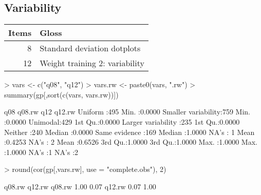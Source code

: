 \documentclass[11pt]{article}
\begin{document}
\subsection{Variability}
\label{sec-3-4}
\begin{center}
\begin{tabular}{rl}
\textbf{Items} & \textbf{Gloss}\\
\hline
8 & Standard deviation dotplots\\
12 & Weight training 2: variability\\
\end{tabular}
\end{center}


\begin{Schunk}
\begin{Sinput}
> vars <- c("q08", "q12")
> vars.rw <- paste0(vars, ".rw")
> summary(gp[,sort(c(vars, vars.rw))])
\end{Sinput}
\begin{Soutput}
       q08          q08.rw                        q12          q12.rw      
 Uniform :495   Min.   :0.0000   Smaller variability:759   Min.   :0.0000  
 Unimodal:429   1st Qu.:0.0000   Larger variability :235   1st Qu.:0.0000  
 Neither :240   Median :0.0000   Same evidence      :169   Median :1.0000  
 NA's    :  1   Mean   :0.4253   NA's               :  2   Mean   :0.6526  
                3rd Qu.:1.0000                             3rd Qu.:1.0000  
                Max.   :1.0000                             Max.   :1.0000  
                NA's   :1                                  NA's   :2       
\end{Soutput}
\begin{Sinput}
> round(cor(gp[,vars.rw], use = "complete.obs"), 2)
\end{Sinput}
\begin{Soutput}
       q08.rw q12.rw
q08.rw   1.00   0.07
q12.rw   0.07   1.00
\end{Soutput}
\end{Schunk}
\end{document}
